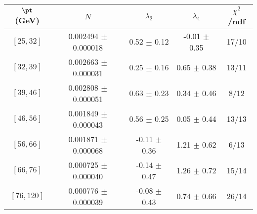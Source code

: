\begin{tabular}{c||c|c|c|c}
$\pt$ (GeV) & $N$ & $\lambda_{2}$ & $\lambda_4$  & $\chi^2$/ndf  \\
\hline
$[25, 32]$ & 0.002494 $\pm$ 0.000018 & 0.52 $\pm$ 0.12 & -0.01 $\pm$ 0.35 & 17/10\\
$[32, 39]$ & 0.002663 $\pm$ 0.000031 & 0.25 $\pm$ 0.16 & 0.65 $\pm$ 0.38 & 13/11\\
$[39, 46]$ & 0.002808 $\pm$ 0.000051 & 0.63 $\pm$ 0.23 & 0.34 $\pm$ 0.46 & 8/12\\
$[46, 56]$ & 0.001849 $\pm$ 0.000043 & 0.56 $\pm$ 0.25 & 0.05 $\pm$ 0.44 & 13/13\\
$[56, 66]$ & 0.001871 $\pm$ 0.000068 & -0.11 $\pm$ 0.36 & 1.21 $\pm$ 0.62 & 6/13\\
$[66, 76]$ & 0.000725 $\pm$ 0.000040 & -0.14 $\pm$ 0.47 & 1.26 $\pm$ 0.72 & 15/14\\
$[76, 120]$ & 0.000776 $\pm$ 0.000039 & -0.08 $\pm$ 0.43 & 0.74 $\pm$ 0.66 & 26/14\\
\end{tabular}
